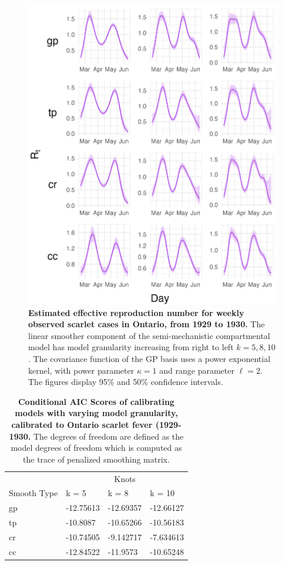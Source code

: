 \documentclass[
11pt, %
oneside, %
english, %
singlespacing, %
]{macthesis} %
\begin{document}
\begin{figure}[H]
\centering
\includegraphics[width=\textwidth, height = \textwidth]{figure/Scarlet/Scarlet_plot_gp(-2,2,1)_k(5,8,10)_gamma(014)_I0(100)_plot_R_t.png}
\caption[Estimated Scarlet Fever Effective Reproduction Number (1929-1930)]{\textbf{Estimated effective reproduction number for weekly observed scarlet cases in Ontario, from 1929 to 1930.} The linear smoother component of the semi-mechanistic compartmental model has model granularity increasing from right to left \(k= 5,8,10\). The covariance function of the GP basis uses a power exponential kernel, with power parameter \(\kappa = 1\) and range parameter \(\ell = 2\). The figures display 95\% and 50\% confidence intervals.}
\label{fig:scarlet_rt}
\end{figure}

\begin{table}[!h]
\centering
\caption{\label{tab:aic-table-scarlet}\textbf{Conditional AIC Scores of calibrating models with varying model granularity, calibrated to Ontario scarlet fever (1929-1930.} The degrees of freedom are defined as the model degrees of freedom which is computed as the trace of penalized smoothing matrix.}
\centering
\begin{tabular}[t]{llll}
\toprule
\multicolumn{1}{c}{ } & \multicolumn{3}{c}{Knots} \\
\cmidrule(l{3pt}r{3pt}){2-4}
Smooth Type & k = 5 & k = 8 & k = 10\\
\midrule
gp & -12.75613 & -12.69357 & -12.66127\\
tp & -10.8087 & -10.65266 & -10.56183\\
cr & -10.74505 & -9.142717 & -7.634613\\
cc & -12.84522 & -11.9573 & -10.65248\\
\bottomrule
\end{tabular}
\end{table}
\end{document}
